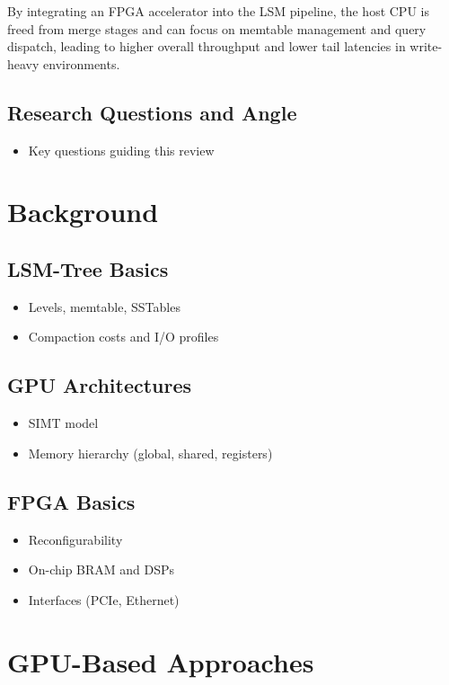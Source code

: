 \documentclass[sigconf]{acmart}
\begin{document}
  By integrating an FPGA accelerator into the LSM pipeline, the host CPU is freed from merge stages and can focus on memtable management and query dispatch, leading to higher overall throughput and lower tail latencies in write-heavy environments.  

  \subsection{Research Questions and Angle}
    \begin{itemize}
      \item Key questions guiding this review
    \end{itemize}

\section{Background}
  \subsection{LSM-Tree Basics}
    \begin{itemize}
      \item Levels, memtable, SSTables
      \item Compaction costs and I/O profiles
    \end{itemize}
  \subsection{GPU Architectures}
    \begin{itemize}
      \item SIMT model
      \item Memory hierarchy (global, shared, registers)
    \end{itemize}
  \subsection{FPGA Basics}
    \begin{itemize}
      \item Reconfigurability
      \item On-chip BRAM and DSPs
      \item Interfaces (PCIe, Ethernet)
    \end{itemize}

\section{GPU-Based Approaches}
\end{document}
